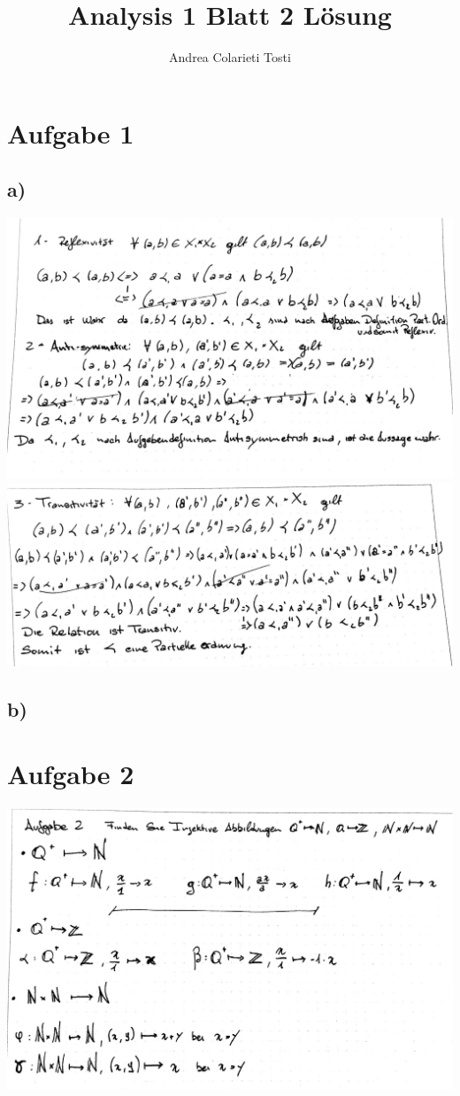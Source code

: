 \documentclass[12pt,a4paper,landscape]{article}
\author{Andrea Colarieti Tosti}
\title{Analysis 1 Blatt 2 Lösung}
\begin{document}
\maketitle \newpage
\section*{Aufgabe 1}
\subsection*{a)}
\includegraphics[scale=0.3]{AB2-1a_1.jpg} \newpage
\includegraphics[scale=0.3]{AB2-1a_2.jpg} 
\subsection*{b)}
\section*{Aufgabe 2}
\includegraphics[scale=0.3]{AB2-2_1.jpg} 
\end{document}
